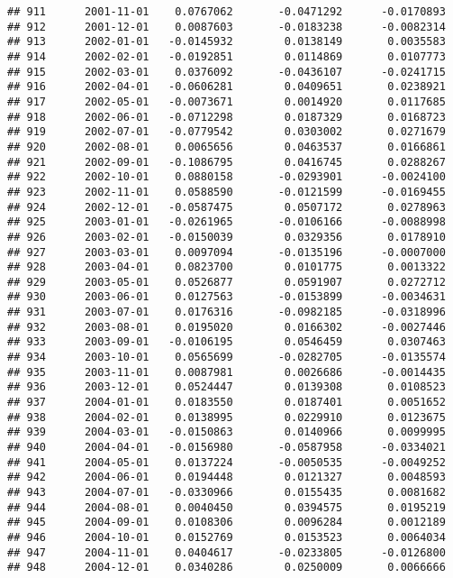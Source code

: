 \documentclass[
]{article}
\begin{document}
\begin{verbatim}
## 911      2001-11-01    0.0767062       -0.0471292      -0.0170893
## 912      2001-12-01    0.0087603       -0.0183238      -0.0082314
## 913      2002-01-01   -0.0145932        0.0138149       0.0035583
## 914      2002-02-01   -0.0192851        0.0114869       0.0107773
## 915      2002-03-01    0.0376092       -0.0436107      -0.0241715
## 916      2002-04-01   -0.0606281        0.0409651       0.0238921
## 917      2002-05-01   -0.0073671        0.0014920       0.0117685
## 918      2002-06-01   -0.0712298        0.0187329       0.0168723
## 919      2002-07-01   -0.0779542        0.0303002       0.0271679
## 920      2002-08-01    0.0065656        0.0463537       0.0166861
## 921      2002-09-01   -0.1086795        0.0416745       0.0288267
## 922      2002-10-01    0.0880158       -0.0293901      -0.0024100
## 923      2002-11-01    0.0588590       -0.0121599      -0.0169455
## 924      2002-12-01   -0.0587475        0.0507172       0.0278963
## 925      2003-01-01   -0.0261965       -0.0106166      -0.0088998
## 926      2003-02-01   -0.0150039        0.0329356       0.0178910
## 927      2003-03-01    0.0097094       -0.0135196      -0.0007000
## 928      2003-04-01    0.0823700        0.0101775       0.0013322
## 929      2003-05-01    0.0526877        0.0591907       0.0272712
## 930      2003-06-01    0.0127563       -0.0153899      -0.0034631
## 931      2003-07-01    0.0176316       -0.0982185      -0.0318996
## 932      2003-08-01    0.0195020        0.0166302      -0.0027446
## 933      2003-09-01   -0.0106195        0.0546459       0.0307463
## 934      2003-10-01    0.0565699       -0.0282705      -0.0135574
## 935      2003-11-01    0.0087981        0.0026686      -0.0014435
## 936      2003-12-01    0.0524447        0.0139308       0.0108523
## 937      2004-01-01    0.0183550        0.0187401       0.0051652
## 938      2004-02-01    0.0138995        0.0229910       0.0123675
## 939      2004-03-01   -0.0150863        0.0140966       0.0099995
## 940      2004-04-01   -0.0156980       -0.0587958      -0.0334021
## 941      2004-05-01    0.0137224       -0.0050535      -0.0049252
## 942      2004-06-01    0.0194448        0.0121327       0.0048593
## 943      2004-07-01   -0.0330966        0.0155435       0.0081682
## 944      2004-08-01    0.0040450        0.0394575       0.0195219
## 945      2004-09-01    0.0108306        0.0096284       0.0012189
## 946      2004-10-01    0.0152769        0.0153523       0.0064034
## 947      2004-11-01    0.0404617       -0.0233805      -0.0126800
## 948      2004-12-01    0.0340286        0.0250009       0.0066666

\end{verbatim}
\end{document}

